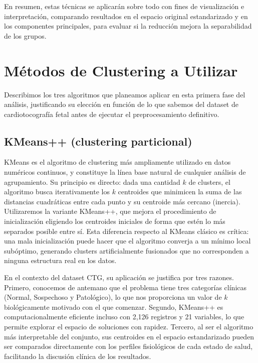 \documentclass[12pt,letterpaper]{article}
\begin{document}
En resumen, estas técnicas se aplicarán sobre todo con fines de visualización e interpretación, comparando resultados en el espacio original estandarizado y en los componentes principales, para evaluar si la reducción mejora la separabilidad de los grupos.

\section{Métodos de Clustering a Utilizar}

Describimos los tres algoritmos
que planeamos aplicar en esta primera fase del análisis, justificando su elección en función de lo
que sabemos del dataset de cardiotocografía fetal antes de ejecutar el preprocesamiento definitivo.

\subsection{K\-Means++ (clustering particional)}

K\-Means es el algoritmo de clustering más ampliamente utilizado en datos numéricos continuos, y
constituye la línea base natural de cualquier análisis de agrupamiento. Su principio es directo:
dada una cantidad $k$ de clusters, el algoritmo busca iterativamente los $k$ centroides que
minimicen la suma de las distancias cuadráticas entre cada punto y su centroide más cercano
(inercia). Utilizaremos la variante K\-Means++, que mejora el procedimiento de inicialización
eligiendo los centroides iniciales de forma que estén lo más separados posible entre sí. Esta
diferencia respecto al K\-Means clásico es crítica: una mala inicialización puede hacer que el
algoritmo converja a un mínimo local subóptimo, generando clusters artificialmente fusionados que
no corresponden a ninguna estructura real en los datos.

En el contexto del dataset CTG, su aplicación se justifica por tres razones. Primero, conocemos de
antemano que el problema tiene tres categorías clínicas (Normal, Sospechoso y Patológico), lo que
nos proporciona un valor de $k$ biológicamente motivado con el que comenzar. Segundo, K\-Means++
es computacionalmente eficiente incluso con 2,126 registros y 21 variables, lo que permite
explorar el espacio de soluciones con rapidez. Tercero, al ser el algoritmo más interpretable del
conjunto, sus centroides en el espacio estandarizado pueden ser comparados directamente con los
perfiles fisiológicos de cada estado de salud, facilitando la discusión clínica de los resultados.
\end{document}
